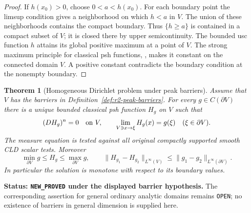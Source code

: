 \documentclass[11pt,a4paper]{article}
\numberwithin{equation}{section}
\newtheorem{theorem}{Theorem}[section]
\theoremstyle{definition}
\theoremstyle{remark}
\begin{document}
\begin{proof}
If $h(x_0)>0$, choose $0<a<h(x_0)$. For each boundary point the
limsup condition gives a neighborhood on which $h<a$ in $V$.
The union of these neighborhoods contains the compact boundary.
Thus $\{h\geq a\}$ is contained in a compact subset of $V$; it
is closed there by upper semicontinuity. The bounded usc
function $h$ attains its global positive maximum at a point
of $V$. The strong maximum principle for classical psh
functions, \cite[Theorem 6.1]{GR25}, makes it constant on the
connected domain $V$. A positive constant contradicts the
boundary condition at the nonempty boundary.
\end{proof}

\begin{theorem}[Homogeneous Dirichlet problem under peak barriers]
\label{thm:r2-peak-dirichlet}
Assume that $V$ has the barriers in
Definition~\ref{def:r2-peak-barriers}. For every
$g\in C(\partial V)$ there is a unique bounded classical psh
function $H_g$ on $V$ such that
\[
 (DH_g)^n=0\quad\hbox{on }V,\qquad
 \lim_{V\ni x\to\xi}H_g(x)=g(\xi)
       \quad(\xi\in\partial V).
\]
The measure equation is tested against all original compactly
supported smooth CLD scalar tests. Moreover
\[
 \min_{\partial V}g\leq H_g\leq\max_{\partial V}g,
 \qquad
 \|H_{g_1}-H_{g_2}\|_{L^\infty(V)}
       \leq\|g_1-g_2\|_{L^\infty(\partial V)} .
\]
In particular the solution is monotone with respect to its
boundary values.
\end{theorem}

\noindent\textbf{Status: \texttt{NEW\_PROVED} under the displayed
barrier hypothesis.} The corresponding assertion for general
ordinary analytic domains remains \texttt{OPEN}; no existence
of barriers in general dimension is supplied here.
\end{document}
